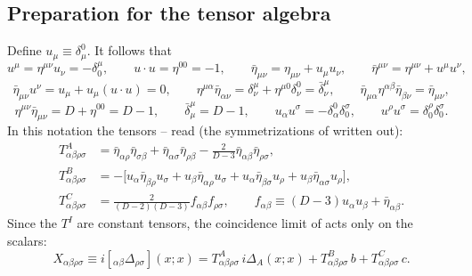 \subsection{Preparation for the tensor algebra \texorpdfstring{\tD}{}}
Define \(u_\mu\equiv\delta^0_\mu\). It follows that
\begin{equation}\label{eq:t4-u1}
u^\mu=\eta^{\mu\nu}u_\nu=-\delta^\mu_0,\qquad u\cdot u=\eta^{00}=-1,\qquad
\bar\eta_{\mu\nu}=\eta_{\mu\nu}+u_\mu u_\nu,\qquad \bar\eta^{\mu\nu}=\eta^{\mu\nu}+u^\mu u^\nu,
\end{equation}
\begin{equation}\label{eq:t4-u2}
\bar\eta_{\mu\nu}u^\nu=u_\mu+u_\mu(u\cdot u)=0,\qquad
\eta^{\mu\alpha}\bar\eta_{\alpha\nu}=\delta^\mu_\nu+\eta^{\mu0}\delta^0_\nu=\bar\delta^\mu_\nu,\qquad
\bar\eta_{\mu\alpha}\eta^{\alpha\beta}\bar\eta_{\beta\nu}=\bar\eta_{\mu\nu},
\end{equation}
\begin{equation}\label{eq:t4-u3}
\eta^{\mu\nu}\bar\eta_{\mu\nu}=D+\eta^{00}=D-1,\qquad \bar\delta^\mu_\mu=D-1,\qquad
u_\alpha u^\sigma=-\delta^0_\alpha\delta^\sigma_0,\qquad u^\rho u^\sigma=\delta^\rho_0\delta^\sigma_0 .
\end{equation}
In this notation the tensors -- read (the symmetrizations of 
written out):
\begin{equation}\label{eq:t4-T}
\begin{aligned}
T^A_{\alpha\beta\rho\sigma}&=\bar\eta_{\alpha\rho}\bar\eta_{\sigma\beta}+\bar\eta_{\alpha\sigma}\bar\eta_{\rho\beta}-\tfrac{2}{D-3}\bar\eta_{\alpha\beta}\bar\eta_{\rho\sigma},\\
T^B_{\alpha\beta\rho\sigma}&=-\bigl[u_\alpha\bar\eta_{\beta\rho}u_\sigma+u_\beta\bar\eta_{\alpha\rho}u_\sigma+u_\alpha\bar\eta_{\beta\sigma}u_\rho+u_\beta\bar\eta_{\alpha\sigma}u_\rho\bigr],\\
T^C_{\alpha\beta\rho\sigma}&=\tfrac{2}{(D-2)(D-3)}f_{\alpha\beta}f_{\rho\sigma},\qquad f_{\alpha\beta}\equiv(D-3)u_\alpha u_\beta+\bar\eta_{\alpha\beta}.
\end{aligned}
\end{equation}
Since the \(T^I\) are constant tensors, the coincidence limit of  acts only on the
scalars:
\begin{equation}\label{eq:t4-X}
X_{\alpha\beta\rho\sigma}\equiv i[{}_{\alpha\beta}\Delta_{\rho\sigma}](x;x)=T^A_{\alpha\beta\rho\sigma}\,i\Delta_A(x;x)+T^B_{\alpha\beta\rho\sigma}\,b+T^C_{\alpha\beta\rho\sigma}\,c .
\end{equation}

